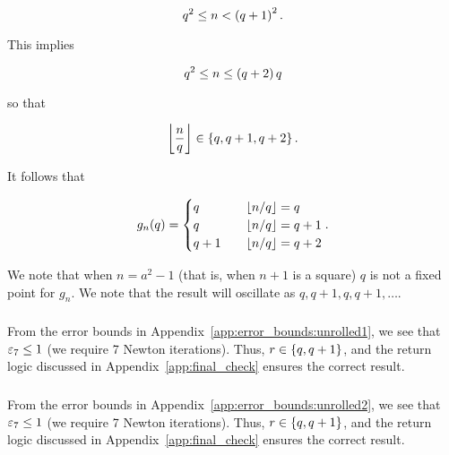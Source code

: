 \begin{equation}
    q^{2} \le n < \left( q+1 \right)^{2}.
\end{equation}

\noindent
This implies

\begin{equation}
    q^{2} \le n \le \left( q+2 \right)q
\end{equation}

\noindent
so that

\begin{equation}
    \left\lfloor \frac{n}{q} \right\rfloor\in\left\{ q, q+1, q+2 \right\}.
\end{equation}

\noindent
It follows that

\begin{equation}
    g_{n}(q) = \begin{cases}
        q &\quad \left\lfloor n/q \right\rfloor = q \\
        q &\quad \left\lfloor n/q \right\rfloor = q+1 \\
        q+1 &\quad \left\lfloor n/q \right\rfloor = q+2 \\
    \end{cases}.
\end{equation}

\noindent
We note that when $n = a^{2} - 1$ (that is, when $n+1$ is a square)
$q$ is not a fixed point for $g_{n}$.
We note that the result will oscillate as $q, q+1, q, q+1, \dots$.

\subsubsection{\UnrolledOne{}}

From the error bounds in Appendix~\ref{app:error_bounds:unrolled1},
we see that $\varepsilon_{7}\le1$ (we require 7 Newton iterations).
Thus, $r\in\left\{ q,q+1 \right\}$, and the return logic
discussed in Appendix~\ref{app:final_check} ensures the correct result.

\subsubsection{\UnrolledTwo{}}

From the error bounds in Appendix~\ref{app:error_bounds:unrolled2},
we see that $\varepsilon_{7}\le1$ (we require 7 Newton iterations).
Thus, $r\in\left\{ q,q+1 \right\}$, and the return logic
discussed in Appendix~\ref{app:final_check} ensures the correct result.

\subsubsection{\UnrolledThree{}}


